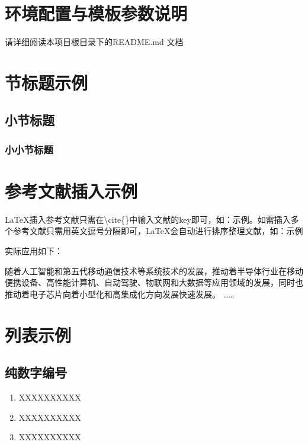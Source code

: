 \section{环境配置与模板参数说明}
请详细阅读本项目根目录下的README.md 文档

\section{节标题示例}

\subsection{小节标题}

\subsubsection{小小节标题}

\section{参考文献插入示例}

    \LaTeX 插入参考文献只需在\textbackslash{cite\{\}}中输入文献的key即可，如：示例\cite{Lau_2022}。如需插入多个参考文献只需用英文逗号分隔即可，\LaTeX 会自动进行排序整理文献，如：示例\cite{Sadique.Murtaza.ea_2022, Tan.Du.ea_2021, Lau_2022}

    实际应用如下：

    随着人工智能和第五代移动通信技术等系统技术的发展\cite{Lau_2022}，推动着半导体行业在移动便携设备、高性能计算机、自动驾驶、物联网和大数据等应用领域的发展\cite{Lau_2022}，同时也推动着电子芯片向着小型化和高集成化方向发展快速发展\cite{Lau_2022,Sadique.Murtaza.ea_2022, Tan.Du.ea_2021,Ying2018,redmonYOLO9000}。
……

\section{列表示例}

\subsection{纯数字编号}
\begin{enumerate}
 \item XXXXXXXXXX
 \item XXXXXXXXXX
 \item XXXXXXXXXX
\end{enumerate}

